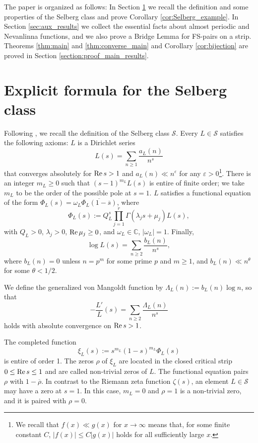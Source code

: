 \documentclass[a4paper,reqno,12pt]{amsart}
\renewcommand{\S}{\mathcal{S}}
\newcommand{\cp}{\mathbb{C}} %
\newcommand{\ep}{\varepsilon}
\newcommand{\ov}[1]{\overline{#1}}
\newcommand{\1}{{\bf 1}}
\newcommand{\ra}{\rightarrow}
\renewcommand{\Re}{{\rm Re}\,}
\begin{document}
The paper is organized as follows: In Section \ref{section:applications} we recall the definition and some properties of the Selberg class and prove Corollary \ref{cor:Selberg_example}. In Section \ref{sec:aux_results} we collect the essential facts about almost periodic and Nevanlinna functions, and we also prove a Bridge Lemma for FS-pairs on a strip. Theorems \ref{thm:main} and \ref{thm:converse_main} and Corollary \ref{cor:bijection} are proved in Section \ref{section:proof_main_results}.

\section{Explicit formula for the Selberg class}\label{section:applications}

Following \cite{KP}, we recall the definition of the Selberg class $\S$. Every $L\in\S$ satisfies the following axioms: $L$ is a Dirichlet series
\begin{equation*}
    L(s)=\sum_{n\geq1} \frac{a_L(n)}{n^s}
\end{equation*}
that converges absolutely for $\Re{s}>1$ and $a_L(n)\ll n^\ep$ for any $\ep>0$\footnote{We recall that $f(x)\ll g(x)$ for $x\ra\infty$ means that, for some finite constant $C$, $|f(x)|\leq C|g(x)|$ holds for all sufficiently large $x$.}. There is an integer $m_L\geq0$ such that $(s-1)^{m_L}L(s)$ is entire of finite order; we take $m_L$ to be the order of the possible pole at $s=1$. $L$ satisfies a functional equation of the form $\Phi_L(s)=\omega_L\ov{\Phi_L(1-\ov{s})}$, where
\begin{equation*}
\Phi_L(s):=Q_L^s\prod_{j=1}^r\Gamma(\lambda_js+\mu_j)L(s),
\end{equation*}
with $Q_L>0$, $\lambda_j>0$, $\Re\mu_j\geq0$, and $\omega_L\in\cp$, $|\omega_L|=1$. Finally,
\begin{equation*}
    \log L(s)=\sum_{n\geq2}\frac{b_L(n)}{n^s},
\end{equation*}
where $b_L(n)=0$ unless $n=p^m$ for some prime $p$ and $m\geq1$, and $b_L(n)\ll n^{\theta}$ for some $\theta<1/2$.

We define the generalized von Mangoldt function by $\Lambda_L(n):=b_L(n)\log n$, so that
\begin{equation}
\label{eq:log_derivative_Selberg}
    -\frac{L'}{L}(s)=\sum_{n\geq2}\frac{\Lambda_L(n)}{n^s}
\end{equation}
holds with absolute convergence on $\Re{s}>1$.

The completed function
\begin{equation*}
    \xi_L(s):=s^{m_L}(1-s)^{m_L}\Phi_L(s)
\end{equation*}
is entire of order 1. The zeros $\rho$ of $\xi_L$ are located in the closed critical strip $0\leq\Re{s}\leq1$ and are called non-trivial zeros of $L$. The functional equation pairs $\rho$ with $1-\ov{\rho}$. In contrast to the Riemann zeta function $\zeta(s)$, an element $L\in\S$ may have a zero at $s=1$. In this case, $m_L=0$ and $\rho=1$ is a non-trivial zero, and it is paired with $\rho=0$.
\end{document}
